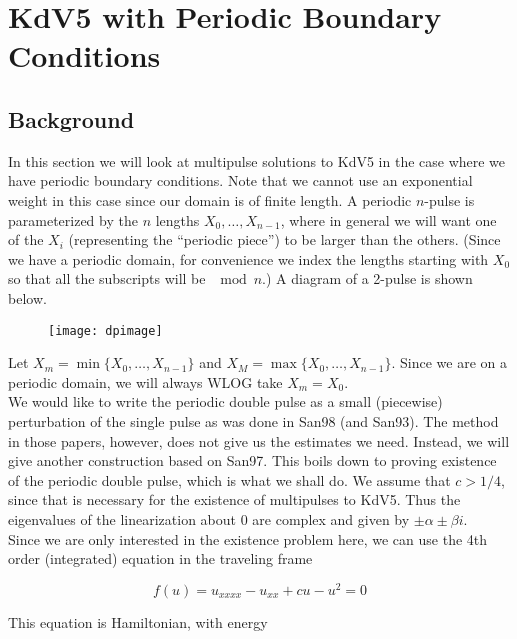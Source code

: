 \documentclass[12pt]{article}
\begin{document}
\section{KdV5 with Periodic Boundary Conditions}

\subsection{Background}

In this section we will look at multipulse solutions to KdV5 in the case where we have periodic boundary conditions. Note that we cannot use an exponential weight in this case since our domain is of finite length. A periodic $n$-pulse is parameterized by the $n$ lengths $X_0, \dots, X_{n-1}$, where in general we will want one of the $X_i$ (representing the ``periodic piece'') to be larger than the others. (Since we have a periodic domain, for convenience we index the lengths starting with $X_0$ so that all the subscripts will be $\mod n$.) A diagram of a 2-pulse is shown below.

\begin{figure}[H]
\texttt{[image: dpimage]}
\end{figure}

Let $X_m = \min \{ X_0, \dots, X_{n-1} \}$ and $X_M = \max \{ X_0, \dots, X_{n-1} \}$. Since we are on a periodic domain, we will always WLOG take $X_m = X_0$.\\

We would like to write the periodic double pulse as a small (piecewise) perturbation of the single pulse as was done in San98 (and San93). The method in those papers, however, does not give us the estimates we need. Instead, we will give another construction based on San97. This boils down to proving existence of the periodic double pulse, which is what we shall do. We assume that $c > 1/4$, since that is necessary for the existence of multipulses to KdV5. Thus the eigenvalues of the linearization about $0$ are complex and given by $\pm \alpha \pm \beta i$.\\

Since we are only interested in the existence problem here, we can use the 4th order (integrated) equation in the traveling frame

\begin{equation}\label{4thorder}
f(u) = u_{xxxx} - u_{xx} + c u - u^2 = 0
\end{equation}

This equation is Hamiltonian, with energy 
\end{document}
